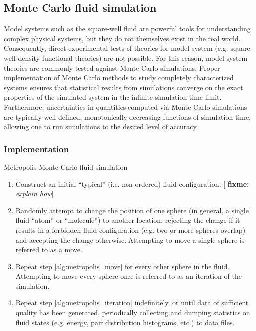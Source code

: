 \documentclass[11pt]{article}
\newenvironment{alg}
{\hrulefill\begin{enumerate}}
{\end{enumerate}\hrulefill}
\newcommand{\red}[1]{{\bf \color{red} #1}}
\newcommand{\fixme}[1]{[\red{fixme:} \emph{#1}]}
\begin{document}
\subsection{Monte Carlo fluid simulation}
\label{sec:mc_sim}

Model systems such as the square-well fluid are powerful tools for
understanding complex physical systems, but they do not themselves
exist in the real world. Consequently, direct experimental tests of
theories for model system (e.g. square-well density functional
theories) are not possible. For this reason, model system theories are
commonly tested against Monte Carlo simulations. Proper implementation
of Monte Carlo methods to study completely characterized systems
ensures that statistical results from simulations converge on the
exact properties of the simulated system in the infinite simulation
time limit. Furthermore, uncertainties in quantities computed via
Monte Carlo simulations are typically well-defined, monotonically
decreasing functions of simulation time, allowing one to run
simulations to the desired level of accuracy.

\subsubsection{Implementation}
\label{sec:mc_implementation}

\begin{algorithm}[tb]
  \caption{Metropolis Monte Carlo fluid simulation}
  \label{alg:metropolis}
  \begin{alg}

  \item Construct an initial ``typical'' (i.e. non-ordered) fluid
    configuration. \fixme{explain how}

  \item Randomly attempt to change the position of one sphere (in
    general, a single fluid ``atom'' or ``molecule'') to another
    location, rejecting the change if it results in a forbidden fluid
    configuration (e.g. two or more spheres overlap) and accepting the
    change otherwise. Attempting to move a single sphere is referred
    to as a move. \label{alg:metropolis_move}

  \item Repeat step \ref{alg:metropolis_move} for every other sphere
    in the fluid. Attempting to move every sphere once is referred to
    as an iteration of the simulation.
    \label{alg:metropolis_iteration}

  \item Repeat step \ref{alg:metropolis_iteration} indefinitely, or
    until data of sufficient quality has been generated, periodically
    collecting and dumping statistics on fluid states (e.g. energy,
    pair distribution histograms, etc.) to data files.

  \end{alg}
\end{algorithm}
\end{document}
